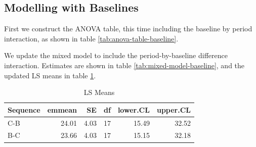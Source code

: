 \subsection{Modelling with Baselines}\label{modelling-with-baselines}

First we construct the ANOVA table, this time including the baseline by
period interaction, as shown in table \ref{tab:anova-table-baseline}.

\begin{Shaded}
\begin{Highlighting}[]
\OtherTok{\textless{}{-}} \SpecialCharTok{\textasciitilde{}}\SpecialCharTok{+}\SpecialCharTok{*}\SpecialCharTok{+}\SpecialCharTok{+}
                             \SpecialCharTok{\%\textgreater{}\%}
  \NormalTok{()}
\end{Highlighting}
\end{Shaded}

We update the mixed model to include the period-by-baseline difference
interaction. Estimates are shown in table
\ref{tab:mixed-model-baseline}, and the updated LS means in table
\ref{tab:emmeans-baseline}.

\begin{Shaded}
\begin{Highlighting}[]
\OtherTok{\textless{}{-}} \SpecialCharTok{\textasciitilde{}}\SpecialCharTok{+}\SpecialCharTok{*}\SpecialCharTok{+}\SpecialCharTok{+}\NormalTok{ (}\SpecialCharTok{|}
\end{Highlighting}
\end{Shaded}

\begin{table}

\caption{\label{tab:emmeans-baseline}LS Means}
\centering
\begin{tabular}[t]{lrrrrr}
\toprule
Sequence & emmean & SE & df & lower.CL & upper.CL\\
\midrule
C-B & 24.01 & 4.03 & 17 & 15.49 & 32.52\\
B-C & 23.66 & 4.03 & 17 & 15.15 & 32.18\\
\bottomrule
\end{tabular}
\end{table}
